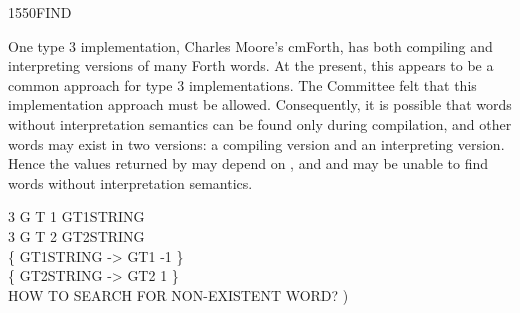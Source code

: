 \begin{worddef}{1550}{FIND}
\begin{defer}
		One type 3 implementation, Charles Moore's cmForth, has both
		compiling and interpreting versions of many Forth words. At the
		present, this appears to be a common approach for type 3
		implementations. The Committee felt that this implementation
		approach must be allowed. Consequently, it is possible that
		words without interpretation semantics can be found only during
		compilation, and other words may exist in two versions: a
		compiling version and an interpreting version. Hence the values
		returned by  may depend on , and 
		and \word{[']} may be unable to find words without
		interpretation semantics.

	\testing
			3 
			 G 
			 T 
			 1 
			 GT1STRING \\
			3 
			 G 
			 T 
			 2 
			 GT2STRING \\
		\{ GT1STRING  ->  GT1 -1 \} \\
		\{ GT2STRING  ->  GT2 1  \} \\
		 HOW TO SEARCH FOR NON-EXISTENT WORD? )
	\end{defer}
\end{worddef}


